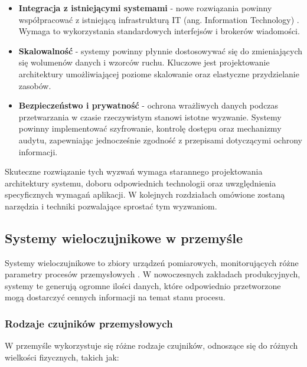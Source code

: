 \begin{itemize}
    \item \textbf{Integracja z istniejącymi systemami} - nowe rozwiązania powinny współpracować z istniejącą infrastrukturą IT (ang. Information Technology) \cite{tanenbaum2011computer}. Wymaga to wykorzystania standardowych interfejsów i brokerów wiadomości.
    
    \item \textbf{Skalowalność} - systemy powinny płynnie dostosowywać się do zmieniających się wolumenów danych i wzorców ruchu. Kluczowe jest projektowanie architektury umożliwiającej poziome skalowanie oraz elastyczne przydzielanie zasobów.
    
    \item \textbf{Bezpieczeństwo i prywatność} - ochrona wrażliwych danych podczas przetwarzania w czasie rzeczywistym stanowi istotne wyzwanie. Systemy powinny implementować szyfrowanie, kontrolę dostępu oraz mechanizmy audytu, zapewniając jednocześnie zgodność z przepisami dotyczącymi ochrony informacji.
\end{itemize}

\vspace{0.3em}

Skuteczne rozwiązanie tych wyzwań wymaga starannego projektowania architektury systemu, doboru odpowiednich technologii oraz uwzględnienia specyficznych wymagań aplikacji. W kolejnych rozdziałach omówione zostaną narzędzia i techniki pozwalające sprostać tym wyzwaniom.

\subsection{Systemy wieloczujnikowe w przemyśle}
\label{subsec:systemy_wieloczujnikowe}

Systemy wieloczujnikowe to zbiory urządzeń pomiarowych, monitorujących różne parametry procesów przemysłowych \cite{multisensor_systems}.
W nowoczesnych zakładach produkcyjnych, systemy te generują ogromne ilości danych, które odpowiednio przetworzone mogą dostarczyć cennych informacji na temat stanu procesu.

\subsubsection{Rodzaje czujników przemysłowych}
\label{subsubsec:rodzaje_czujnikow}

W przemyśle wykorzystuje się różne rodzaje czujników, odnoszące się do różnych wielkości fizycznych, takich jak:

